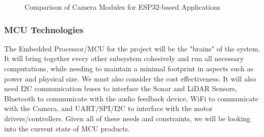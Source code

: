 \begin{figure}[H]
	\centering
	\setlength{\tabcolsep}{5pt} %
	\renewcommand{\arraystretch}{1.75} %
	\caption{\label{fig:compareCameras}Comparison of Camera Modules for ESP32-based Applications}
\end{figure}


\subsubsection{MCU Technologies}
\label{sec:mcu_tech}
\noindent The Embedded Processor/MCU for the project will be the "brains" of the system. It will bring together every other subsystem cohesively and run all necessary computations, while needing to maintain a minimal footprint in aspects such as power and physical size. We must also consider the cost effectiveness. It will also need I2C communication buses to interface the Sonar and LiDAR Sensors, Bluetooth to communicate with the audio feedback device, WiFi to communicate with the Camera, and UART/SPI/I2C to interface with the motor drivers/controllers. Given all of these needs and constraints, we will be looking into the current state of MCU products. \\

